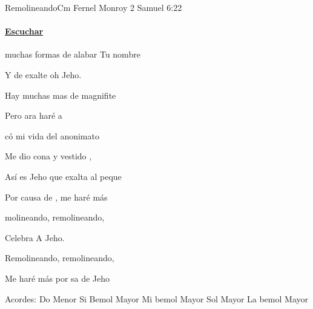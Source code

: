\documentclass[12pt, spanish]{book}
\begin{document}
    \begin{song}{Remolineando}{Cm}
    {} %
    {Fernel Monroy}
    {2 Samuel 6:22} %
    {}
        \ifChordBk
        \paragraph{\mbox{}\hfill\protect\href{https://open.spotify.com/intl-es/track/1NmECxDikubj4Hhu1dbrhl}{Escuchar}\mbox{}\hfill}
        \fi



        \begin{SBOpGroup}
             muchas formas de alabar Tu nombre

            Y de exalte oh Jeho.

            Hay muchas mas de magnifite

            Pero ara  haré a
        \end{SBOpGroup}

        \begin{SBOpGroup}
            có mi vida del anonimato

            Me dio cona y vestido ,

            Así es Jeho que exalta al peque

            Por causa de ,  me haré más 
        \end{SBOpGroup}

        \begin{SBChorus}
            molineando, remolineando,

            Celebra A Jeho.

            Remolineando, remolineando,

            Me haré más  por sa de Jeho
        \end{SBChorus}

        \ifChordBk
        \begin{SBOpGroup}
            Acordes:\break
            \upchord{\Cm}\qquad Do Menor \hfill
            \upchord{\Bflat}\qquad Si Bemol Mayor \hfill\null\break
            \upchord{\Eflat}\qquad Mi bemol Mayor \hfill
            \upchord{\G}\qquad Sol Mayor \hfill\null\break
            \upchord{\Aflat}\qquad La bemol Mayor \hfill
        \end{SBOpGroup}
        \fi


\end{song}
\end{document}
